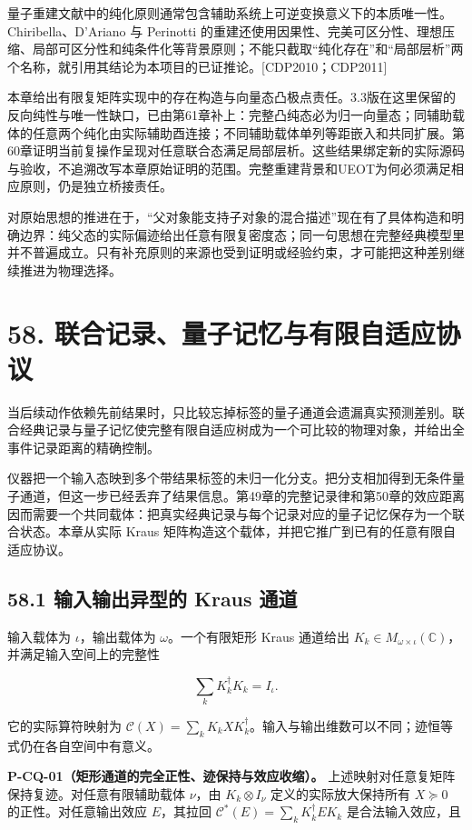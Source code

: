 \documentclass[
  11pt,
  oneside]{book}
\begin{document}
量子重建文献中的纯化原则通常包含辅助系统上可逆变换意义下的本质唯一性。Chiribella、D'Ariano
与 Perinotti
的重建还使用因果性、完美可区分性、理想压缩、局部可区分性和纯条件化等背景原则；不能只截取``纯化存在''和``局部层析''两个名称，就引用其结论为本项目的已证推论。{[}CDP2010；CDP2011{]}

本章给出有限复矩阵实现中的存在构造与向量态凸极点责任。3.3版在这里保留的反向纯性与唯一性缺口，已由第61章补上：完整凸纯态必为归一向量态；同辅助载体的任意两个纯化由实际辅助酉连接；不同辅助载体单列等距嵌入和共同扩展。第60章证明当前复操作呈现对任意联合态满足局部层析。这些结果绑定新的实际源码与验收，不追溯改写本章原始证明的范围。完整重建背景和UEOT为何必须满足相应原则，仍是独立桥接责任。

对原始思想的推进在于，``父对象能支持子对象的混合描述''现在有了具体构造和明确边界：纯父态的实际偏迹给出任意有限复密度态；同一句思想在完整经典模型里并不普遍成立。只有补充原则的来源也受到证明或经验约束，才可能把这种差别继续推进为物理选择。

\chapter{58. 联合记录、量子记忆与有限自适应协议}\label{ch-58}\hypertarget{ch-58}{}

当后续动作依赖先前结果时，只比较忘掉标签的量子通道会遗漏真实预测差别。联合经典记录与量子记忆使完整有限自适应树成为一个可比较的物理对象，并给出全事件记录距离的精确控制。

仪器把一个输入态映到多个带结果标签的未归一化分支。把分支相加得到无条件量子通道，但这一步已经丢弃了结果信息。第49章的完整记录律和第50章的效应距离因而需要一个共同载体：把真实经典记录与每个记录对应的量子记忆保存为一个联合状态。本章从实际
Kraus 矩阵构造这个载体，并把它推广到已有的任意有限自适应协议。

\section{58.1 输入输出异型的 Kraus 通道}

输入载体为 \(\iota\)，输出载体为 \(\omega\)。一个有限矩形 Kraus 通道给出
\(K_k\in M_{\omega\times\iota}(\mathbb C)\)，并满足输入空间上的完整性

\[
\sum_kK_k^\dagger K_k=I_\iota.
\]

它的实际算符映射为
\(\mathcal C(X)=\sum_kK_kXK_k^\dagger\)。输入与输出维数可以不同；迹恒等式仍在各自空间中有意义。

\protect\hypertarget{p-cq-01}{}{}

\textbf{P-CQ-01（矩形通道的完全正性、迹保持与效应收缩）。}
上述映射对任意复矩阵保持复迹。对任意有限辅助载体 \(\nu\)，由
\(K_k\otimes I_\nu\) 定义的实际放大保持所有 \(X\succeq0\)
的正性。对任意输出效应 \(E\)，其拉回
\(\mathcal C^*(E)=\sum_kK_k^\dagger E K_k\) 是合法输入效应，且
\end{document}
